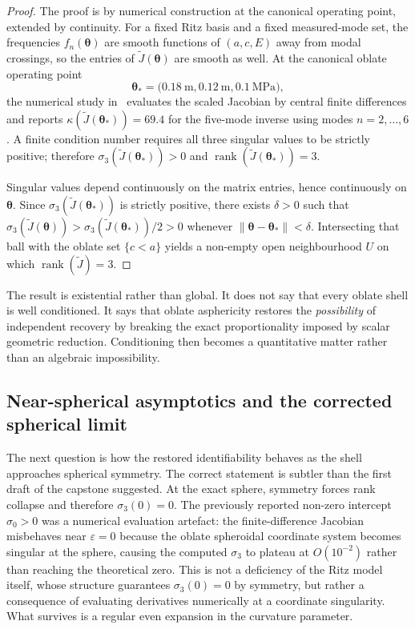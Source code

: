 \begin{proof}
The proof is by numerical construction at the canonical operating point,
extended by continuity.  For a fixed Ritz basis and a fixed measured-mode set,
the frequencies $f_n(\boldsymbol{\theta})$ are smooth functions of $(a,c,E)$
away from modal crossings, so the entries of
$\widetilde{J}(\boldsymbol{\theta})$ are smooth as well.  At the canonical
oblate operating point
\begin{equation}
  \boldsymbol{\theta}_*
  =
  \bigl(\SI{0.18}{\metre},\SI{0.12}{\metre},\SI{0.1}{\mega\pascal}\bigr),
\end{equation}
the numerical study in~\cite{BrowntoneP8} evaluates the scaled Jacobian by
central finite differences and reports
$\kappa(\widetilde{J}(\boldsymbol{\theta}_*))=69.4$ for the five-mode inverse
using modes $n=2,\ldots,6$.  A finite condition number requires all three
singular values to be strictly positive; therefore
$\sigma_3(\widetilde{J}(\boldsymbol{\theta}_*))>0$ and
$\operatorname{rank}(\widetilde{J}(\boldsymbol{\theta}_*))=3$.

Singular values depend continuously on the matrix entries, hence continuously
on $\boldsymbol{\theta}$.  Since
$\sigma_3(\widetilde{J}(\boldsymbol{\theta}_*))$ is strictly positive, there
exists $\delta>0$ such that
$\sigma_3(\widetilde{J}(\boldsymbol{\theta}))>\sigma_3(\widetilde{J}(\boldsymbol{\theta}_*))/2>0$
whenever $\|\boldsymbol{\theta}-\boldsymbol{\theta}_*\|<\delta$.  Intersecting
that ball with the oblate set $\{c<a\}$ yields a non-empty open neighbourhood
$U$ on which $\operatorname{rank}(\widetilde{J})=3$.
\end{proof}

The result is existential rather than global.  It does not say that every
oblate shell is well conditioned.  It says that oblate asphericity restores the
\emph{possibility} of independent recovery by breaking the exact proportionality
imposed by scalar geometric reduction.  Conditioning then becomes a quantitative
matter rather than an algebraic impossibility.

\subsection{Near-spherical asymptotics and the corrected spherical limit}

The next question is how the restored identifiability behaves as the shell
approaches spherical symmetry.  The correct statement is subtler than the first
draft of the capstone suggested.  At the exact sphere, symmetry forces rank
collapse and therefore $\sigma_3(0)=0$.  The previously reported non-zero
intercept $\sigma_0>0$ was a numerical evaluation artefact: the
finite-difference Jacobian misbehaves near $\varepsilon=0$ because the oblate
spheroidal coordinate system becomes singular at the sphere, causing the
computed $\sigma_3$ to plateau at $O(10^{-2})$ rather than reaching the
theoretical zero.  This is not a deficiency of the Ritz model itself, whose
structure guarantees $\sigma_3(0)=0$ by symmetry, but rather a consequence of
evaluating derivatives numerically at a coordinate singularity.
What survives is a regular even expansion in the curvature parameter.

